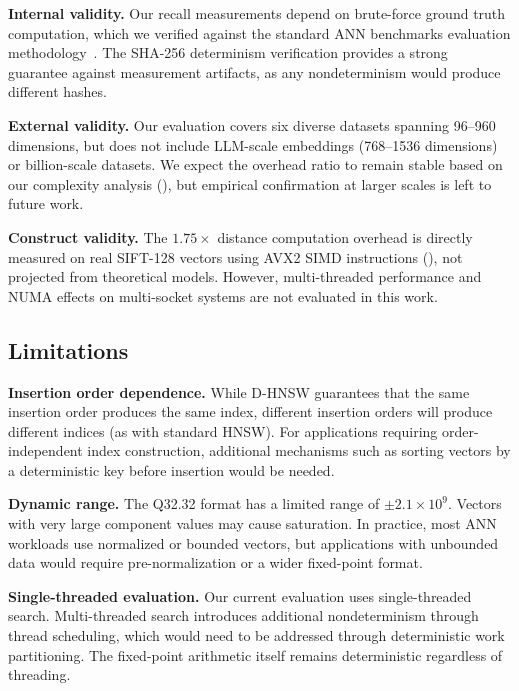 \documentclass[10pt,journal]{IEEEtran}
\newcommand{\dhnsw}{\textsc{D-HNSW}}
\newcommand{\hnsw}{\textsc{HNSW}}
\begin{document}
\textbf{Internal validity.} Our recall measurements depend on brute-force ground truth computation, which we verified against the standard ANN benchmarks evaluation methodology~\cite{simhadri2022neurips}. The SHA-256 determinism verification provides a strong guarantee against measurement artifacts, as any nondeterminism would produce different hashes.

\textbf{External validity.} Our evaluation covers six diverse datasets spanning 96--960 dimensions, but does not include LLM-scale embeddings (768--1536 dimensions) or billion-scale datasets. We expect the overhead ratio to remain stable based on our complexity analysis (), but empirical confirmation at larger scales is left to future work.

\textbf{Construct validity.} The $1.75\times$ distance computation overhead is directly measured on real SIFT-128 vectors using AVX2 SIMD instructions (), not projected from theoretical models. However, multi-threaded performance and NUMA effects on multi-socket systems are not evaluated in this work.

\subsection{Limitations}

\textbf{Insertion order dependence.} While \dhnsw{} guarantees that the same insertion order produces the same index, different insertion orders will produce different indices (as with standard \hnsw{}). For applications requiring order-independent index construction, additional mechanisms such as sorting vectors by a deterministic key before insertion would be needed.

\textbf{Dynamic range.} The Q32.32 format has a limited range of $\pm 2.1 \times 10^9$. Vectors with very large component values may cause saturation. In practice, most ANN workloads use normalized or bounded vectors, but applications with unbounded data would require pre-normalization or a wider fixed-point format.

\textbf{Single-threaded evaluation.} Our current evaluation uses single-threaded search. Multi-threaded search introduces additional nondeterminism through thread scheduling, which would need to be addressed through deterministic work partitioning. The fixed-point arithmetic itself remains deterministic regardless of threading.

\end{document}

